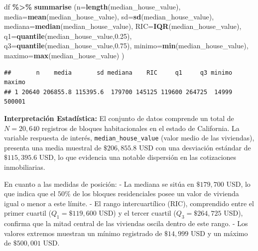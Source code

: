 \documentclass[
]{book}
\newenvironment{Shaded}{\begin{snugshade}}{\end{snugshade}}
\newcommand{\AttributeTok}[1]{\textcolor[rgb]{0.13,0.29,0.53}{#1}}
\newcommand{\FloatTok}[1]{\textcolor[rgb]{0.00,0.00,0.81}{#1}}
\newcommand{\FunctionTok}[1]{\textcolor[rgb]{0.13,0.29,0.53}{\textbf{#1}}}
\newcommand{\NormalTok}[1]{#1}
\newcommand{\SpecialCharTok}[1]{\textcolor[rgb]{0.81,0.36,0.00}{\textbf{#1}}}
\begin{document}
\begin{Shaded}
\begin{Highlighting}[]
\NormalTok{df }\SpecialCharTok{\%\textgreater{}\%}  \FunctionTok{summarise}\NormalTok{ (}\AttributeTok{n=}\FunctionTok{length}\NormalTok{(median\_house\_value),}
                            \AttributeTok{media=}\FunctionTok{mean}\NormalTok{(median\_house\_value),}
                            \AttributeTok{sd=}\FunctionTok{sd}\NormalTok{(median\_house\_value),}
                            \AttributeTok{mediana=}\FunctionTok{median}\NormalTok{(median\_house\_value),}
                            \AttributeTok{RIC=}\FunctionTok{IQR}\NormalTok{(median\_house\_value),}
                            \AttributeTok{q1=}\FunctionTok{quantile}\NormalTok{(median\_house\_value,}\FloatTok{0.25}\NormalTok{),}
                            \AttributeTok{q3=}\FunctionTok{quantile}\NormalTok{(median\_house\_value,}\FloatTok{0.75}\NormalTok{),}
                            \AttributeTok{minimo=}\FunctionTok{min}\NormalTok{(median\_house\_value),}
                            \AttributeTok{maximo=}\FunctionTok{max}\NormalTok{(median\_house\_value)}
\NormalTok{                            ) }
\end{Highlighting}
\end{Shaded}

\begin{verbatim}
##       n    media       sd mediana    RIC     q1     q3 minimo maximo
## 1 20640 206855.8 115395.6  179700 145125 119600 264725  14999 500001
\end{verbatim}

\textbf{Interpretación Estadística:}
El conjunto de datos comprende un total de \(N = 20,640\) registros de bloques habitacionales en el estado de California. La variable respuesta de interés, \texttt{median\_house\_value} (valor medio de las viviendas), presenta una media muestral de \(\$206,855.8\) USD con una desviación estándar de \(\$115,395.6\) USD, lo que evidencia una notable dispersión en las cotizaciones inmobiliarias.

En cuanto a las medidas de posición:
- La mediana se sitúa en \(\$179,700\) USD, lo que indica que el \(50\%\) de los bloques residenciales posee un valor de vivienda igual o menor a este límite.
- El rango intercuartílico (RIC), comprendido entre el primer cuartil (\(Q_1 = \$119,600\) USD) y el tercer cuartil (\(Q_3 = \$264,725\) USD), confirma que la mitad central de las viviendas oscila dentro de este rango.
- Los valores extremos muestran un mínimo registrado de \(\$14,999\) USD y un máximo de \(\$500,001\) USD.
\end{document}
